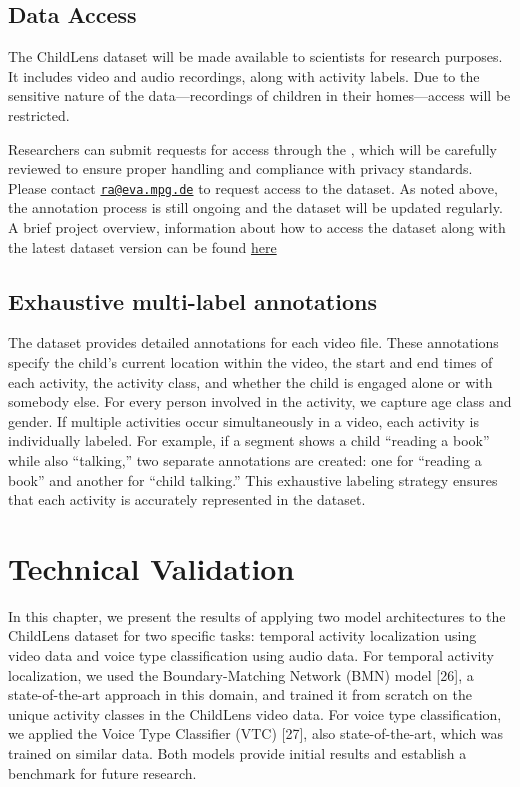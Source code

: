 \documentclass[
  man,floatsintext]{apa6}
\begin{document}
\subsection{Data Access}\label{data-access}

The ChildLens dataset will be made available to scientists for research purposes. It includes video and audio recordings, along with activity labels. Due to the sensitive nature of the data---recordings of children in their homes---access will be restricted.

Researchers can submit requests for access through the , which will be carefully reviewed to ensure proper handling and compliance with privacy standards. Please contact \href{mailto:ra@eva.mpg.de}{\nolinkurl{ra@eva.mpg.de}} to request access to the dataset. As noted above, the annotation process is still ongoing and the dataset will be updated regularly. A brief project overview, information about how to access the dataset along with the latest dataset version can be found \href{https://www.eva.mpg.de/comparative-cultural-psychology/technical-development/childlens/}{here}

\subsection{Exhaustive multi-label annotations}\label{exhaustive-multi-label-annotations}

The dataset provides detailed annotations for each video file. These annotations specify the child's current location within the video, the start and end times of each activity, the activity class, and whether the child is engaged alone or with somebody else. For every person involved in the activity, we capture age class and gender. If multiple activities occur simultaneously in a video, each activity is individually labeled. For example, if a segment shows a child ``reading a book'' while also ``talking,'' two separate annotations are created: one for ``reading a book'' and another for ``child talking.'' This exhaustive labeling strategy ensures that each activity is accurately represented in the dataset.

\section{Technical Validation}\label{technical-validation}

In this chapter, we present the results of applying two model architectures to the ChildLens dataset for two specific tasks: temporal activity localization using video data and voice type classification using audio data. For temporal activity localization, we used the Boundary-Matching Network (BMN) model {[}26{]}, a state-of-the-art approach in this domain, and trained it from scratch on the unique activity classes in the ChildLens video data. For voice type classification, we applied the Voice Type Classifier (VTC) {[}27{]}, also state-of-the-art, which was trained on similar data. Both models provide initial results and establish a benchmark for future research.
\end{document}
